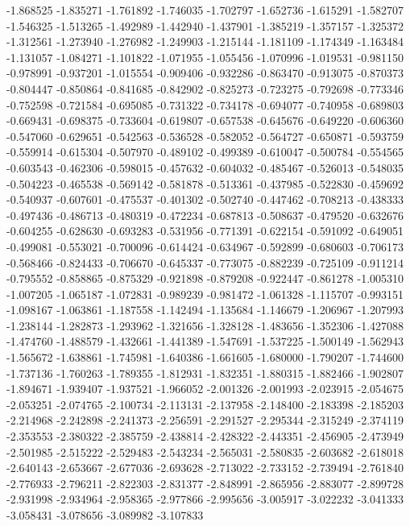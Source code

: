 -1.868525
-1.835271
-1.761892
-1.746035
-1.702797
-1.652736
-1.615291
-1.582707
-1.546325
-1.513265
-1.492989
-1.442940
-1.437901
-1.385219
-1.357157
-1.325372
-1.312561
-1.273940
-1.276982
-1.249903
-1.215144
-1.181109
-1.174349
-1.163484
-1.131057
-1.084271
-1.101822
-1.071955
-1.055456
-1.070996
-1.019531
-0.981150
-0.978991
-0.937201
-1.015554
-0.909406
-0.932286
-0.863470
-0.913075
-0.870373
-0.804447
-0.850864
-0.841685
-0.842902
-0.825273
-0.723275
-0.792698
-0.773346
-0.752598
-0.721584
-0.695085
-0.731322
-0.734178
-0.694077
-0.740958
-0.689803
-0.669431
-0.698375
-0.733604
-0.619807
-0.657538
-0.645676
-0.649220
-0.606360
-0.547060
-0.629651
-0.542563
-0.536528
-0.582052
-0.564727
-0.650871
-0.593759
-0.559914
-0.615304
-0.507970
-0.489102
-0.499389
-0.610047
-0.500784
-0.554565
-0.603543
-0.462306
-0.598015
-0.457632
-0.604032
-0.485467
-0.526013
-0.548035
-0.504223
-0.465538
-0.569142
-0.581878
-0.513361
-0.437985
-0.522830
-0.459692
-0.540937
-0.607601
-0.475537
-0.401302
-0.502740
-0.447462
-0.708213
-0.438333
-0.497436
-0.486713
-0.480319
-0.472234
-0.687813
-0.508637
-0.479520
-0.632676
-0.604255
-0.628630
-0.693283
-0.531956
-0.771391
-0.622154
-0.591092
-0.649051
-0.499081
-0.553021
-0.700096
-0.614424
-0.634967
-0.592899
-0.680603
-0.706173
-0.568466
-0.824433
-0.706670
-0.645337
-0.773075
-0.882239
-0.725109
-0.911214
-0.795552
-0.858865
-0.875329
-0.921898
-0.879208
-0.922447
-0.861278
-1.005310
-1.007205
-1.065187
-1.072831
-0.989239
-0.981472
-1.061328
-1.115707
-0.993151
-1.098167
-1.063861
-1.187558
-1.142494
-1.135684
-1.146679
-1.206967
-1.207993
-1.238144
-1.282873
-1.293962
-1.321656
-1.328128
-1.483656
-1.352306
-1.427088
-1.474760
-1.488579
-1.432661
-1.441389
-1.547691
-1.537225
-1.500149
-1.562943
-1.565672
-1.638861
-1.745981
-1.640386
-1.661605
-1.680000
-1.790207
-1.744600
-1.737136
-1.760263
-1.789355
-1.812931
-1.832351
-1.880315
-1.882466
-1.902807
-1.894671
-1.939407
-1.937521
-1.966052
-2.001326
-2.001993
-2.023915
-2.054675
-2.053251
-2.074765
-2.100734
-2.113131
-2.137958
-2.148400
-2.183398
-2.185203
-2.214968
-2.242898
-2.241373
-2.256591
-2.291527
-2.295344
-2.315249
-2.374119
-2.353553
-2.380322
-2.385759
-2.438814
-2.428322
-2.443351
-2.456905
-2.473949
-2.501985
-2.515222
-2.529483
-2.543234
-2.565031
-2.580835
-2.603682
-2.618018
-2.640143
-2.653667
-2.677036
-2.693628
-2.713022
-2.733152
-2.739494
-2.761840
-2.776933
-2.796211
-2.822303
-2.831377
-2.848991
-2.865956
-2.883077
-2.899728
-2.931998
-2.934964
-2.958365
-2.977866
-2.995656
-3.005917
-3.022232
-3.041333
-3.058431
-3.078656
-3.089982
-3.107833
